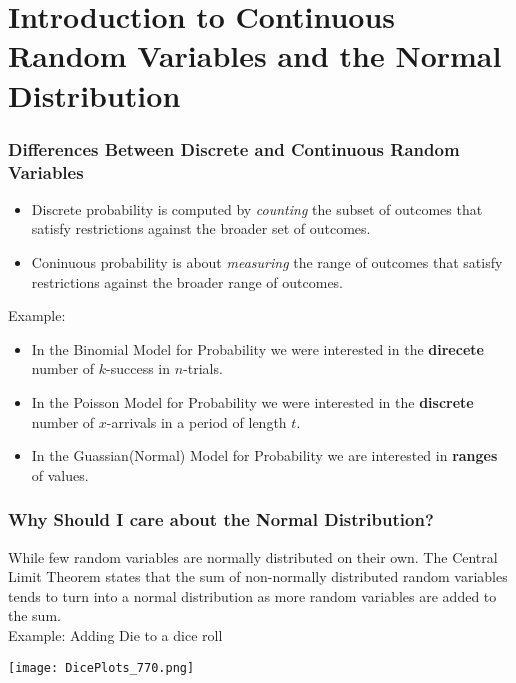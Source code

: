 \documentclass[12pt]{beamer}
\begin{document}
\section{Introduction to Continuous Random Variables and the Normal Distribution}
	\begin{frame}
		\frametitle{Differences Between Discrete and Continuous Random Variables}
		\begin{itemize}
			\item Discrete probability is computed by \textit{counting} the subset of outcomes that satisfy restrictions against the broader set of outcomes.
			\item Coninuous probability is about \textit{measuring} the range of outcomes that satisfy restrictions against the broader range of outcomes.
		\end{itemize}
	Example: 
	\begin{itemize}
		\item In the Binomial Model for Probability we were interested in the \textbf{direcete} number of $k$-success in $n$-trials.
		\item In the Poisson Model for Probability we were interested in the \textbf{discrete} number of $x$-arrivals in a period of length $t$.
		\item In the Guassian(Normal) Model for Probability we are interested in \textbf{ranges} of values.  
	\end{itemize}	
	\end{frame}
	
	\begin{frame}
		\frametitle{Why Should I care about the Normal Distribution?}
		While few random variables are normally distributed on their own. The Central Limit Theorem states that the sum of non-normally distributed random variables tends to turn into a normal distribution as more random variables are added to the sum. \\
		
		Example: Adding Die to a dice roll
		\begin{center}
		\texttt{[image: DicePlots\_770.png]}
		\end{center}
		
		
	\end{frame}
\end{document}
